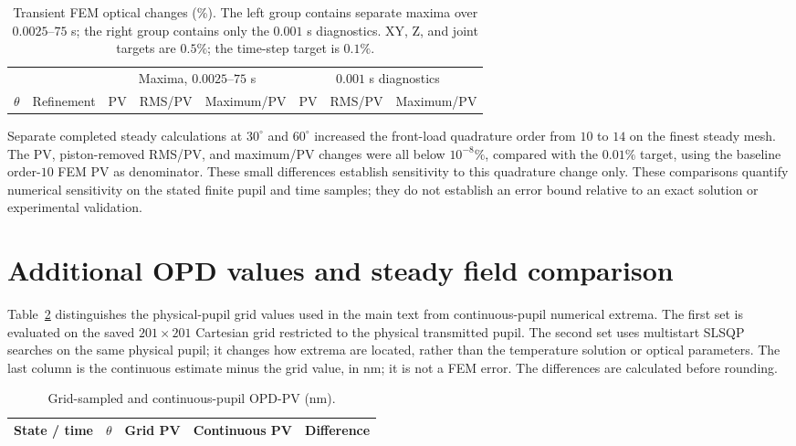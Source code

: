 \documentclass[9pt]{osa-supplemental-document}
\begin{document}
\begin{table}[!htbp]\centering\scriptsize
\setlength{\tabcolsep}{4pt}
\caption{Transient FEM optical changes (\%). The left group contains separate maxima over $0.0025$--$75$ s; the right group contains only the $0.001$ s diagnostics. XY, Z, and joint targets are $0.5\%$; the time-step target is $0.1\%$.}\label{tab:supp-fem-optical-transient}
\begin{tabular}{clrrrrrr}\toprule
 & & \multicolumn{3}{c}{Maxima, $0.0025$--$75$ s} & \multicolumn{3}{c}{$0.001$ s diagnostics}\\
\cmidrule(lr){3-5}\cmidrule(lr){6-8}
$\theta$ & Refinement & PV & RMS/PV & Maximum/PV & PV & RMS/PV & Maximum/PV\\\midrule

\end{tabular}
\end{table}

Separate completed steady calculations at $30^\circ$ and $60^\circ$ increased the front-load quadrature order from $10$ to $14$ on the finest steady mesh.
The PV, piston-removed RMS/PV, and maximum/PV changes were all below $10^{-8}\%$, compared with the $0.01\%$ target, using the baseline order-$10$ FEM PV as denominator.
These small differences establish sensitivity to this quadrature change only.
These comparisons quantify numerical sensitivity on the stated finite pupil and time samples; they do not establish an error bound relative to an exact solution or experimental validation.
\FloatBarrier

\section{Additional OPD values and steady field comparison}
Table~\ref{tab:supp-pupil-pv} distinguishes the physical-pupil grid values used in the main text from continuous-pupil numerical extrema.
The first set is evaluated on the saved $201\times201$ Cartesian grid restricted to the physical transmitted pupil.
The second set uses multistart SLSQP searches on the same physical pupil; it changes how extrema are located, rather than the temperature solution or optical parameters.
The last column is the continuous estimate minus the grid value, in nm; it is not a FEM error.
The differences are calculated before rounding.

\begin{table}[!htbp]\centering\small
\caption{Grid-sampled and continuous-pupil OPD-PV (nm).}\label{tab:supp-pupil-pv}
\begin{tabular}{lrrrr}\toprule
State / time & $\theta$ & Grid PV & Continuous PV & Difference\\\midrule

\end{tabular}
\end{table}
\end{document}
